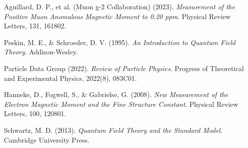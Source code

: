 \documentclass[12pt,a4paper]{article}
\begin{document}
	\begin{thebibliography}{10}
		
		Aguillard, D. P., et al. (Muon g-2 Collaboration) (2023). 
		\textit{Measurement of the Positive Muon Anomalous Magnetic Moment to 0.20 ppm}. 
		Physical Review Letters, 131, 161802.
		
		Peskin, M. E., \& Schroeder, D. V. (1995). 
		\textit{An Introduction to Quantum Field Theory}. 
		Addison-Wesley.
		
		Particle Data Group (2022). 
		\textit{Review of Particle Physics}. 
		Progress of Theoretical and Experimental Physics, 2022(8), 083C01.
		
		Hanneke, D., Fogwell, S., \& Gabrielse, G. (2008). 
		\textit{New Measurement of the Electron Magnetic Moment and the Fine Structure Constant}. 
		Physical Review Letters, 100, 120801.
		
		Schwartz, M. D. (2013). 
		\textit{Quantum Field Theory and the Standard Model}. 
		Cambridge University Press.
		
	\end{thebibliography}
	
\end{document}
